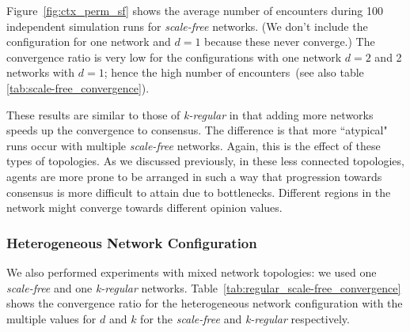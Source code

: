 \documentclass[preprint,number]{elsarticle}
\begin{document}
      \noindent Figure~\ref{fig:ctx_perm_sf} shows the average number of encounters during 100
      independent simulation runs for \textit{scale-free} networks. (We don't include the
      configuration for one network and $d = 1$ because these never converge.) The convergence ratio
      is very low for the configurations with one network $d = 2$ and 2 networks with $d = 1$; hence
      the high number of encounters~(see also table \ref{tab:scale-free_convergence}).

      These results are similar to those of \textit{k-regular} in that adding more networks speeds
      up the convergence to consensus. The difference is that more ``atypical" runs occur with
      multiple \textit{scale-free} networks. Again, this is the effect of these types of
      topologies. As we discussed previously, in these less connected topologies, agents are more
      prone to be arranged in such a way that progression towards consensus is more difficult to
      attain due to bottlenecks. Different regions in the network might converge towards different
      opinion values.

      \subsubsection{Heterogeneous Network Configuration}
      \noindent We also performed experiments with mixed network topologies: we used one
      \textit{scale-free} and one \textit{k-regular}
      networks. Table~\ref{tab:regular_scale-free_convergence} shows the convergence ratio for the
      heterogeneous network configuration with the multiple values for $d$ and $k$ for the
      \textit{scale-free} and \textit{k-regular} respectively.
\end{document}
